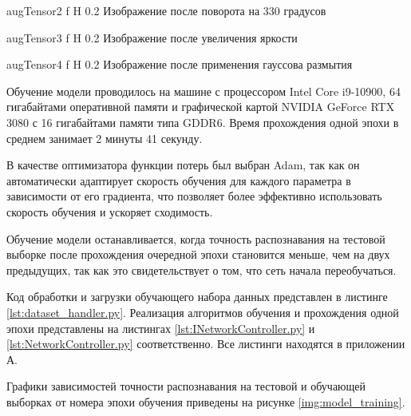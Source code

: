 {augTensor2} %
{f} %
{H} %
{0.2\textwidth} %
{Изображение после поворота на 330 градусов} %

{augTensor3} %
{f} %
{H} %
{0.2\textwidth} %
{Изображение после увеличения яркости} %

{augTensor4} %
{f} %
{H} %
{0.2\textwidth} %
{Изображение после применения гауссова размытия} %

Обучение модели проводилось на машине с процессором Intel Core i9-10900, 64 гигабайтами оперативной памяти и графической картой NVIDIA GeForce RTX 3080 с 16 гигабайтами памяти типа GDDR6. Время прохождения одной эпохи в среднем занимает 2 минуты 41 секунду.

В качестве оптимизатора функции потерь был выбран Adam, так как он автоматически адаптирует скорость обучения для каждого параметра в зависимости от его градиента, что позволяет более эффективно использовать скорость обучения и ускоряет сходимость.

Обучение модели останавливается, когда точность распознавания на тестовой выборке после прохождения очередной эпохи становится меньше, чем на двух предыдущих, так как это свидетельствует о том, что сеть начала переобучаться.

Код обработки и загрузки обучающего набора данных представлен в листинге \ref{lst:dataset_handler.py}. Реализация алгоритмов обучения и прохождения одной эпохи представлены на листингах \ref{lst:INetworkController.py} и \ref{lst:NetworkController.py} соответственно. Все листинги находятся в приложении А.

Графики зависимостей точности распознавания на тестовой и обучающей выборках от номера эпохи обучения приведены на рисунке \ref{img:model_training}.


